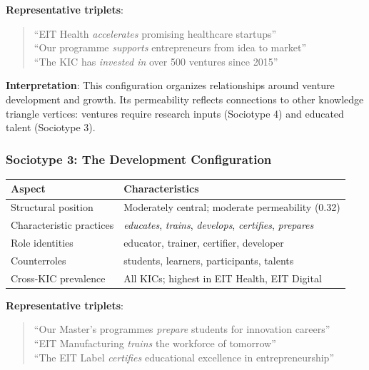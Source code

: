 \documentclass[../main.tex]{subfiles}
\begin{document}
\textbf{Representative triplets}:
\begin{quote}
\small
``EIT Health \textit{accelerates} promising healthcare startups''\\
``Our programme \textit{supports} entrepreneurs from idea to market''\\
``The KIC has \textit{invested in} over 500 ventures since 2015''
\end{quote}

\textbf{Interpretation}: This configuration organizes relationships around venture development and growth. Its permeability reflects connections to other knowledge triangle vertices: ventures require research inputs (Sociotype 4) and educated talent (Sociotype 3).

\subsubsection{Sociotype 3: The Development Configuration}

\begin{center}
\small
\begin{tabular}{ll}
\toprule
\textbf{Aspect} & \textbf{Characteristics} \\
\midrule
Structural position & Moderately central; moderate permeability (0.32) \\
Characteristic practices & \textit{educates}, \textit{trains}, \textit{develops}, \textit{certifies}, \textit{prepares} \\
Role identities & educator, trainer, certifier, developer \\
Counterroles & students, learners, participants, talents \\
Cross-KIC prevalence & All KICs; highest in EIT Health, EIT Digital \\
\bottomrule
\end{tabular}
\end{center}

\textbf{Representative triplets}:
\begin{quote}
\small
``Our Master's programmes \textit{prepare} students for innovation careers''\\
``EIT Manufacturing \textit{trains} the workforce of tomorrow''\\
``The EIT Label \textit{certifies} educational excellence in entrepreneurship''
\end{quote}
\end{document}
